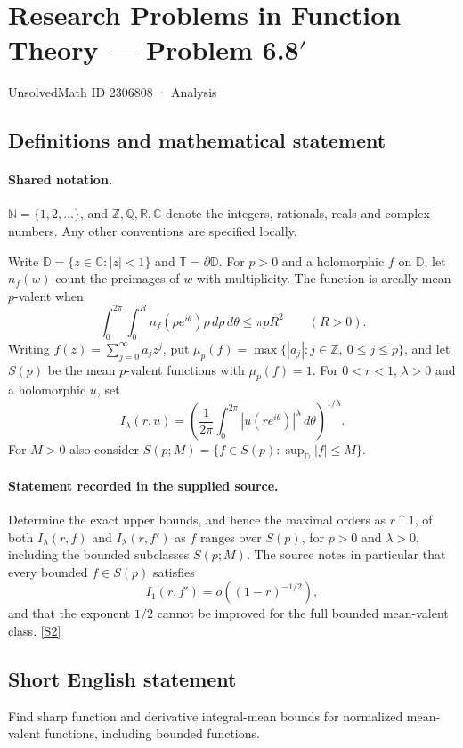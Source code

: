 \documentclass[11pt]{article}
\newcommand{\sref}[2]{\hyperlink{source:#1:#2}{[S#2]}}
\begin{document}
\setcounter{section}{2306807}
\section{Research Problems in Function Theory — Problem 6.8$\prime$}\label{2306808}
{\small\sffamily UnsolvedMath ID 2306808 · Analysis}
\subsection{Definitions and mathematical statement}

\paragraph{Shared notation.}$\mathbb N=\{1,2,\ldots\}$, and $\mathbb Z,\mathbb Q,\mathbb R,\mathbb C$ denote the integers, rationals, reals and complex numbers. Any other conventions are specified locally.


Write $\mathbb D=\{z\in\mathbb C:|z|<1\}$ and $\mathbb T=\partial\mathbb D$. For $p>0$ and a holomorphic $f$ on $\mathbb D$, let $n_f(w)$ count the preimages of $w$ with multiplicity. The function is areally mean $p$-valent when
\[\int_0^{2\pi}\int_0^R n_f(\rho e^{i\theta})\rho\,d\rho\,d\theta\leq\pi pR^2\qquad(R>0).\]
Writing $f(z)=\sum_{j=0}^{\infty}a_jz^j$, put $\mu_p(f)=\max\{|a_j|:j\in\mathbb Z,\ 0\leq j\leq p\}$, and let $S(p)$ be the mean $p$-valent functions with $\mu_p(f)=1$.
For $0<r<1$, $\lambda>0$ and a holomorphic $u$, set
\[I_\lambda(r,u)=\left(\frac1{2\pi}\int_0^{2\pi}|u(re^{i\theta})|^\lambda\,d\theta\right)^{1/\lambda}.\]
For $M>0$ also consider $S(p;M)=\{f\in S(p):\sup_{\mathbb D}|f|\leq M\}$.
\paragraph{Statement recorded in the supplied source.}
Determine the exact upper bounds, and hence the maximal orders as $r\uparrow1$, of both $I_\lambda(r,f)$ and $I_\lambda(r,f')$ as $f$ ranges over $S(p)$, for $p>0$ and $\lambda>0$, including the bounded subclasses $S(p;M)$. The source notes in particular that every bounded $f\in S(p)$ satisfies
\[I_1(r,f')=o((1-r)^{-1/2}),\]
and that the exponent $1/2$ cannot be improved for the full bounded mean-valent class. \sref{2306808}{2}
\subsection{Short English statement}
Find sharp function and derivative integral-mean bounds for normalized mean-valent functions, including bounded functions.
\end{document}
